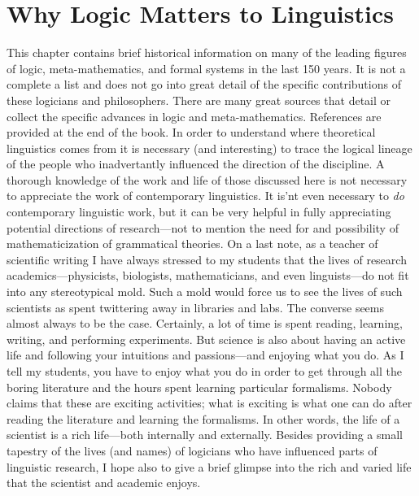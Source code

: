 
\section{Why Logic Matters to Linguistics}
This chapter contains brief historical information on many of the leading figures of logic, meta-mathematics, and formal systems in the last 150 years. It is not a complete a list and does not go into great detail of the specific contributions of these logicians and philosophers. There are many great sources that detail or collect the specific advances in logic and meta-mathematics. References are provided at the end of the book. In order to understand where theoretical linguistics comes from it is necessary (and interesting) to trace the logical lineage of the people who inadvertantly influenced the direction of the discipline. A thorough knowledge of the work and life of those discussed here is not necessary to appreciate the work of contemporary linguistics. It is'nt even necessary to \textsl{do} contemporary linguistic work, but it can be very helpful in fully appreciating potential directions of research---not to mention the need for and possibility of mathematicization of grammatical theories. On a last note, as a teacher of scientific writing I have always stressed to my students that the lives of research academics---physicists, biologists, mathematicians, and even linguists---do not fit into any stereotypical mold. Such a mold would force us to see the lives of such scientists as spent twittering away in libraries and labs. The converse seems almost always to be the case. Certainly, a lot of time is spent reading, learning, writing, and performing experiments. But science is also about having an active life and following your intuitions and passions---and enjoying what you do. As I tell my students, you have to enjoy what you do in order to get through all the boring literature and the hours spent learning particular formalisms. Nobody claims that these are exciting activities; what is exciting is what one can do after reading the literature and learning the formalisms. In other words, the life of a scientist is a rich life---both internally and externally. Besides providing a small tapestry of the lives (and names) of logicians who have influenced parts of linguistic research, I hope also to give a brief glimpse into the rich and varied life that the scientist and academic enjoys.

